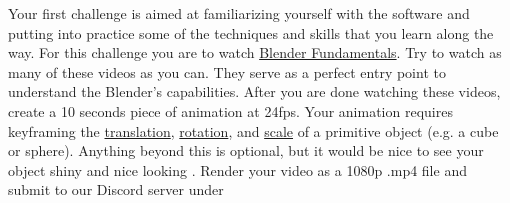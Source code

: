 \begin{itemize}[noitemsep,topsep=0pt,leftmargin=*]
            \newline Your first challenge is aimed at familiarizing yourself with the software and putting into practice some of the techniques and skills that you learn along the way. For this challenge you are to watch \href{https://www.youtube.com/playlist?list=PLa1F2ddGya_-UvuAqHAksYnB0qL9yWDO6}{Blender Fundamentals}. Try to watch as many of these videos as you can. They serve as a perfect entry point to understand the Blender's capabilities. After you are done watching these videos, create a 10 seconds piece of animation at 24fps. Your animation requires keyframing the \ul{translation}, \ul{rotation}, and \ul{scale} of a primitive object (e.g. a cube or sphere). Anything beyond this is optional, but it would be nice to see your object shiny and nice looking . Render your video as a 1080p .mp4 file and submit to our Discord server under 
\end{itemize}
\vspace{1em}